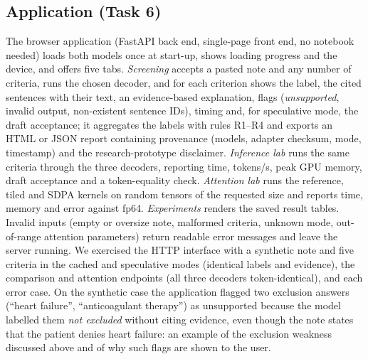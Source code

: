 \subsection{Application (Task 6)}
The browser application (FastAPI back end, single-page front end, no notebook needed) loads both models once at start-up, shows loading progress and the device, and offers five tabs. \emph{Screening} accepts a pasted note and any number of criteria, runs the chosen decoder, and for each criterion shows the label, the cited sentences with their text, an evidence-based explanation, flags (\emph{unsupported}, invalid output, non-existent sentence IDs), timing and, for speculative mode, the draft acceptance; it aggregates the labels with rules R1--R4 and exports an HTML or JSON report containing provenance (models, adapter checksum, mode, timestamp) and the research-prototype disclaimer. \emph{Inference lab} runs the same criteria through the three decoders, reporting time, tokens/s, peak GPU memory, draft acceptance and a token-equality check. \emph{Attention lab} runs the reference, tiled and SDPA kernels on random tensors of the requested size and reports time, memory and error against fp64. \emph{Experiments} renders the saved result tables. Invalid inputs (empty or oversize note, malformed criteria, unknown mode, out-of-range attention parameters) return readable error messages and leave the server running. We exercised the HTTP interface with a synthetic note and five criteria in the cached and speculative modes (identical labels and evidence), the comparison and attention endpoints (all three decoders token-identical), and each error case. On the synthetic case the application flagged two exclusion answers (``heart failure'', ``anticoagulant therapy'') as unsupported because the model labelled them \emph{not excluded} without citing evidence, even though the note states that the patient denies heart failure: an example of the exclusion weakness discussed above and of why such flags are shown to the user.
